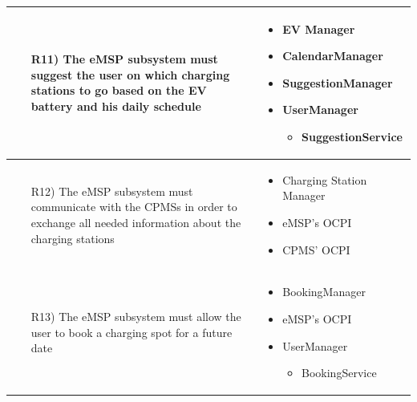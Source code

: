 \documentclass[table, 12pt]{article}
\begin{document}
\begin{longtable}{|p{}|p{}|}
    \begin{itemize}
        \item[R11)] The eMSP subsystem must suggest the user on which charging stations to go based on the EV battery and his daily schedule
    \end{itemize}
    &
    \begin{itemize}
        \item EV Manager
        \item CalendarManager
        \item SuggestionManager
        \item UserManager
        \begin{itemize}
            \setlength{\itemindent}{-5px}
            \item SuggestionService
        \end{itemize}
    \end{itemize}
    \\\hline

    \begin{itemize}
        \item[R12)] The eMSP subsystem must communicate with the CPMSs in order to exchange all needed information about the charging stations
    \end{itemize}
    &
    \begin{itemize}
        \item Charging Station Manager
        \item eMSP's OCPI
        \item CPMS' OCPI
    \end{itemize}
    \\\hline

    \begin{itemize}
        \item[R13)] The eMSP subsystem must allow the user to book a charging spot for a future date
    \end{itemize}
    &
    \begin{itemize}
        \item  BookingManager
        \item eMSP's OCPI
        \item UserManager
        \begin{itemize}\setlength{\itemindent}{-5px}
            \item BookingService
        \end{itemize}
    \end{itemize}
    \\\hline


\end{longtable}
\end{document}
